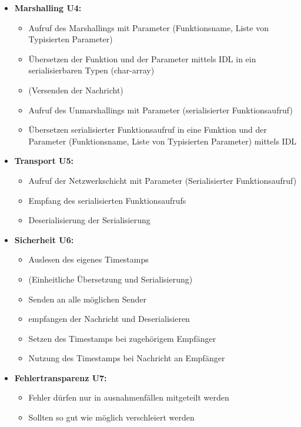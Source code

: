 \begin{itemize}
	\item \textbf{Marshalling U4:}\\
	\begin{itemize}
		\item Aufruf des Marshallings mit Parameter (Funktionsname, Liste von Typisierten Parameter)
		\item Übersetzen der Funktion und der Parameter mittels IDL in ein serialisierbaren Typen (char-array)
		\item (Versenden der Nachricht)
		\item Aufruf des Unmarshallings mit Parameter (serialisierter Funktionsaufruf)
		\item Übersetzen serialisierter Funktionsaufruf in eine Funktion und der Parameter (Funktionsname, Liste von Typisierten Parameter) mittels IDL
	\end{itemize}
	
	\item \textbf{Transport U5:}\\
	\begin{itemize}
		\item Aufruf der Netzwerkschicht mit Parameter (Serialisierter Funktionsaufruf)
		\item Empfang des serialisierten Funktionsaufrufs
		\item Deserialisierung der Serialisierung
	\end{itemize}
	
	\item \textbf{Sicherheit U6:}\\
	\begin{itemize}
		\item Auslesen des eigenes Timestamps 	
		\item (Einheitliche Übersetzung und Serialisierung)
		\item Senden an alle möglichen Sender
		\item empfangen der Nachricht und Deserialisieren
		\item Setzen des Timestamps bei zugehörigem  Empfänger
		\item Nutzung des Timestamps bei Nachricht an Empfänger
	\end{itemize}
	
	\item \textbf{Fehlertransparenz U7:}\\
	\begin{itemize}
		\item Fehler dürfen nur in ausnahmenfällen mitgeteilt werden
		\item Sollten so gut wie möglich verschleiert werden
	\end{itemize}
	

\end{itemize}
